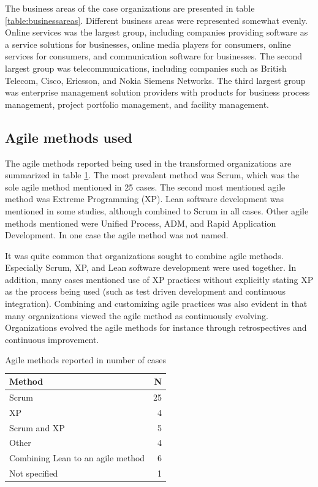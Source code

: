 \documentclass[preprint,authoryear,12pt]{elsarticle}
\begin{document}
The business areas of the case organizations are presented in table
\ref{table:businessareas}. Different business areas were represented somewhat
evenly. Online services was the largest group, including companies
providing software as a service solutions for businesses, online media players
for consumers, online services for consumers, and communication software for
businesses. The second largest group was telecommunications, including companies
such as British Telecom, Cisco, Ericsson, and Nokia Siemens Networks. The third
largest group was enterprise management solution providers with products for
business process management, project portfolio management, and facility
management.


\subsection{Agile methods used}

The agile methods reported being used in the transformed organizations are
summarized in table \ref{table:agilemethods}. The most prevalent method was
Scrum, which was the sole agile method mentioned in 25 cases. The second most
mentioned agile method was Extreme Programming (XP). Lean software development
was mentioned in some studies, although combined to Scrum in all cases. Other
agile methods mentioned were Unified Process, ADM, and Rapid Application
Development. In one case the agile method was not named.

It was quite common that organizations sought to combine agile methods.
Especially Scrum, XP, and Lean software development were used together. In
addition, many cases mentioned use of XP practices without explicitly stating XP
as the process being used (such as test driven development and continuous
integration). Combining and customizing agile practices was also evident in that
many organizations viewed the agile method as continuously evolving.
Organizations evolved the agile methods for instance through retrospectives and
continuous improvement.

\begin{table}[h]
    \centering
    \begin{tabular}{ l r }
        \toprule
        Method                             &  N  \\
        \midrule
        Scrum                              &  25 \\
        XP                                 &  4  \\
        Scrum and XP                       &  5  \\
        Other                              &  4  \\
        Combining Lean to an agile method  &  6  \\
        Not specified                      &  1  \\
        \bottomrule
    \end{tabular}
    \caption{Agile methods reported in number of cases}
    \label{table:agilemethods}
\end{table}
\end{document}

